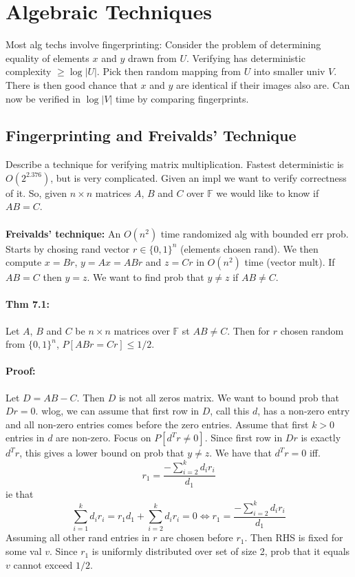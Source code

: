\documentclass[a4paper]{article}
\begin{document}
\section{Algebraic Techniques}
\label{sec:Algebraic Techniques}
Most alg techs involve fingerprinting: Consider the problem of determining equality of elements $x$ and $y$ drawn from $U$. Verifying has deterministic complexity $ \geq \log|U|$. Pick then random mapping from $U$ into smaller univ $V$. There is then good chance that $x$ and $y$ are identical if their images also are. Can now be verified in $\log |V|$ time by comparing fingerprints.
\subsection{Fingerprinting and Freivalds' Technique}
\label{sub:Fingerprinting and Freivalds' Technique}
Describe a technique for verifying matrix multiplication. Fastest deterministic is $O(2^{2.376})$, but is very complicated. Given an impl we want to verify correctness of it. So, given $n\times n$ matrices $A$, $B$ and $C$ over $\mathbb{F}$ we would like to know if $AB=C$.\\\\
\textbf{Freivalds' technique:} An $O(n^2)$ time randomized alg with bounded err prob. Starts by chosing rand vector $r\in\{0,1\}^n$ (elements chosen rand). We then compute $x=Br$, $y=Ax=ABr$ and $z=Cr$ in $O(n^2)$ time (vector mult). If $AB=C$ then $y=z$. We want to find prob that $y\not = z$ if $AB\not = C$.
\paragraph{Thm 7.1:} Let $A$, $B$ and $C$ be $n\times n$ matrices over $ \mathbb{F}$ st $AB\not= C$. Then for $r$ chosen random from $\{0,1\}^n$, $P[ABr=Cr]\leq 1/2$.
\paragraph{Proof:} Let $D=AB-C$. Then $D$ is not all zeros matrix. We want to bound prob that $Dr=0$. wlog, we can assume that first row in $D$, call this $d$, has a non-zero entry and all non-zero entries comes before the zero entries. Assume that first $k>0$ entries in $d$ are non-zero. Focus on $P[d^T r\not = 0]$. Since first row in $Dr$ is exactly $d^Tr$, this gives a lower bound on prob that $y\not = z$. We have that $d^Tr=0$ iff.
$$
  r_1=\frac{-\sum^{k}_{i=2}d_ir_i }{d_1}
$$
ie that
$$
  \sum^{k}_{i=1} d_ir_i=r_1d_1+\sum^{k}_{i=2} d_ir_i = 0\Leftrightarrow r_1=\frac{-\sum^{k}_{i=2}d_ir_i }{d_1}
$$
Assuming all other rand entries in $r$ are chosen before $r_1$. Then RHS is fixed for some val $v$. Since $r_1$ is uniformly distributed over set of size 2, prob that it equals $v$ cannot exceed $1/2$.\\
\end{document}
